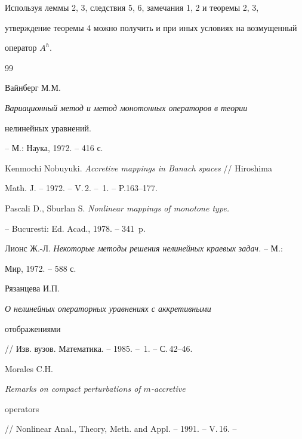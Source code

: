  


Используя леммы 2, 3, следствия 5, 6, замечания 1, 2 и теоремы 2, 3, 


утверждение теоремы 4 можно получить и при иных условиях на возмущенный 


оператор $A^h$. 


 


\begin{thebibliography}{99} 


 




Вайнберг М.М. {\em Вариационный метод и метод монотонных операторов в теории 


нелинейных уравнений.} -- М.: Наука, 1972. -- 416 с. 


 




Kenmochi Nobuyuki. {\em Accretive mappings in Banach spaces} // Hiroshima 


Math. J. -- 1972. -- V.\,2. -- \No\,1. -- P.163--177. 


 




Pascali D., Sburlan S. {\em Nonlinear mappings of monotone type.} 


-- Bucuresti: Ed. Acad., 1978. -- 341~p. 


 




Лионс Ж.-Л. {\em Некоторые методы решения нелинейных краевых задач.} -- М.: 


Мир, 1972. -- 588 с. 


 




Рязанцева И.П. {\em О нелинейных операторных уравнениях с аккретивными 


отображениями} // Изв. вузов. Математика. -- 1985. -- \No\,1. -- С.\,42--46. 


 




Morales C.H. {\em Remarks on compact perturbations of $m$-accretive 


operators} // Nonlinear Anal., Theory, Meth. and Appl. -- 1991. -- V.\,16. -- 



\end{thebibliography}
